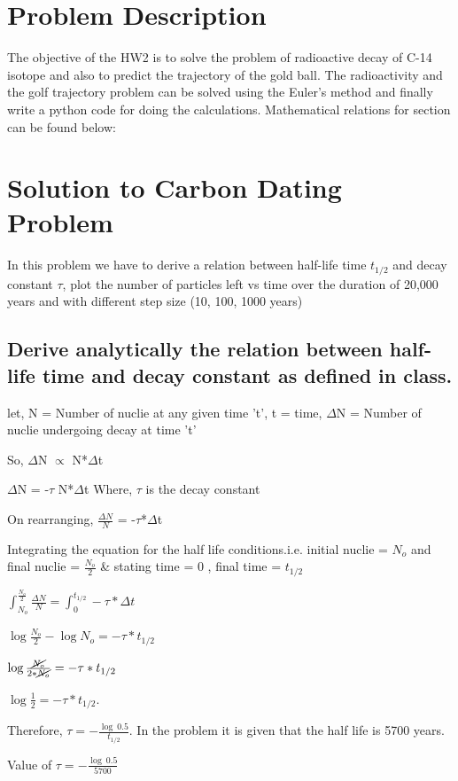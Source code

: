 \documentclass[11pt]{article}
\begin{document}
\section{Problem Description}
The objective of the HW2 is to solve the problem of radioactive decay of C-14 isotope and also to predict the trajectory of the gold ball. The radioactivity and the golf trajectory problem can be solved using the Euler's method and finally write a python code for doing the calculations.  Mathematical relations for section can be found below:

\section{Solution to Carbon Dating Problem}

In this problem we have to derive a relation between half-life time $t_{1/2}$ and decay constant $\tau$,  plot the number of particles left vs time over the duration of 20,000 years and with different step size (10, 100, 1000 years)

\subsection{Derive analytically the relation between half-life time  and decay constant as defined in class.}
let, N = Number of nuclie at any given time 't', t = time, $\Delta$N = Number of nuclie undergoing decay at time 't'

So, $\Delta$N $\propto $ N*$\Delta$t

$\Delta$N = -$\tau$ N*$\Delta$t {Where, $\tau$ is the decay constant}

On rearranging,
$\frac{\Delta N}{N}$ = -$\tau$*$\Delta$t

Integrating the equation for the half life conditions.i.e. initial nuclie = $N_{o}$ and final nuclie = $\frac{N_{o}}{2}$ \& stating time  = 0 , final time = $t_{1/2}$

$\int_{N_{o}}^{\frac{N_{o}}{2}}\frac{\Delta N}{N} = \int_{0}^{t_{1/2}}-\tau*\Delta t$

$\log\frac{N_{o}}{2} - \log N_{o} = -\tau*t_{1/2}$

$\log\frac{\cancel{N_{o}}}{2*\cancel{N_{o}}} = -\tau*t_{1/2}$

$\log\frac{1}{2} = -\tau*t_{1/2}$. 

Therefore, $\tau = -\frac{\log\ 0.5}{t_{1/2}}$.
In the problem it is given that the half life is 5700 years.

Value of $\tau = -\frac{\log\ 0.5}{5700}$
\end{document}
